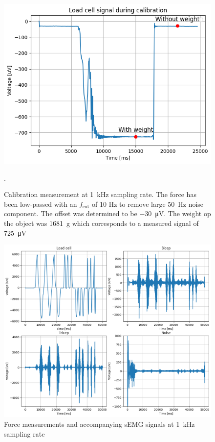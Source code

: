 \begin{figure}[h!t]
	\begin{center}
		\includegraphics[width=0.8\columnwidth]{images/measurement_calibratie3_1k.png}
	\end{center}
	\caption{Calibration measurement at \SI{1}{\kilo\hertz} sampling rate. The force has been low-passed with an $f_\text{cut}$ of 10 Hz to remove large \SI{50}{\hertz} noise component. The offset was determined to be \SI{-30}{\micro\volt}. The weight op the object was \SI{1681}{\gram} which corresponds to a measured signal of \SI{725}{\micro\volt}}.
	\label{fig:calibration_1k}
\end{figure}

\begin{figure}[h!t]
	\begin{center}
		\includegraphics[width=1.0\columnwidth]{images/measurement_meting3_1k.png}
	\end{center}
	\caption{Force measurements and accompanying sEMG signals at \SI{1}{\kilo\hertz} sampling rate}
	\label{fig:measurement_1k}
\end{figure}

